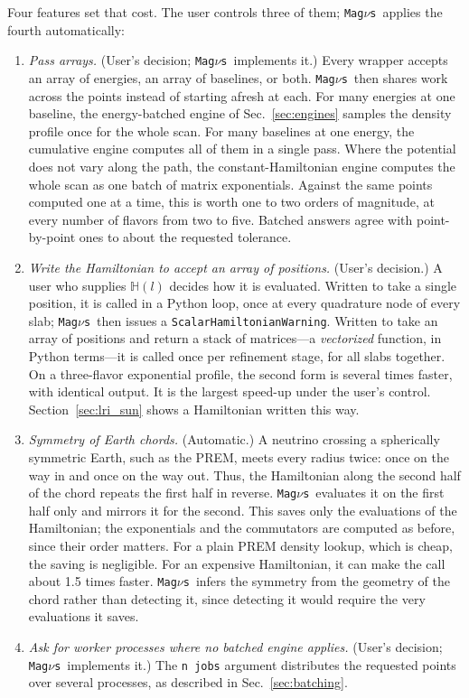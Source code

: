 \documentclass[final,5p,times,twocolumn,sort,compress]{elsarticle}
\makeatletter
\DeclareRobustCommand{\_}{%
  \ifmmode\nfss@text{\textunderscore}\else\textunderscore\allowbreak\fi}
\newcommand{\magnus}{{\tt Mag}\ensuremath{\nu}{\tt s}}
\makeatother
\begin{document}
Four features set that cost. The user controls three of them; \magnus\ applies the fourth automatically:
\begin{enumerate}
\item \emph{Pass arrays.} (User's decision; \magnus\ implements it.) Every wrapper accepts an array of energies, an array of baselines, or both. \magnus\ then shares work across the points instead of starting afresh at each. For many energies at one baseline, the energy-batched engine of Sec.~\ref{sec:engines} samples the density profile once for the whole scan. For many baselines at one energy, the cumulative engine computes all of them in a single pass. Where the potential does not vary along the path, the constant-Hamiltonian engine computes the whole scan as one batch of matrix exponentials. Against the same points computed one at a time, this is worth one to two orders of magnitude, at every number of flavors from two to five. Batched answers agree with point-by-point ones to about the requested tolerance.
\smallskip
\item \emph{Write the Hamiltonian to accept an array of positions.} (User's decision.) A user who supplies $\mathbb{H}(l)$ decides how it is evaluated. Written to take a single position, it is called in a Python loop, once at every quadrature node of every slab; \magnus\ then issues a {\tt ScalarHamiltonianWarning}. Written to take an array of positions and return a stack of matrices---a \textit{vectorized} function, in Python terms---it is called once per refinement stage, for all slabs together. On a three-flavor exponential profile, the second form is several times faster, with identical output. It is the largest speed-up under the user's control. Section~\ref{sec:lri_sun} shows a Hamiltonian written this way.
\smallskip
\item \emph{Symmetry of Earth chords.} (Automatic.) A neutrino crossing a spherically symmetric Earth, such as the PREM, meets every radius twice: once on the way in and once on the way out. Thus, the Hamiltonian along the second half of the chord repeats the first half in reverse. \magnus\ evaluates it on the first half only and mirrors it for the second. This saves only the evaluations of the Hamiltonian; the exponentials and the commutators are computed as before, since their order matters. For a plain PREM density lookup, which is cheap, the saving is negligible. For an expensive Hamiltonian, it can make the call about 1.5 times faster. \magnus\ infers the symmetry from the geometry of the chord rather than detecting it, since detecting it would require the very evaluations it saves.
\smallskip
\item \emph{Ask for worker processes where no batched engine applies.} (User's decision; \magnus\ implements it.) The {\tt n\_jobs} argument distributes the requested points over several processes, as described in Sec.~\ref{sec:batching}.


\end{enumerate}
\end{document}
